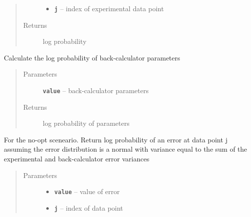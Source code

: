 \documentclass[letterpaper,10pt,english]{sphinxmanual}
\begin{document}
\begin{fulllineitems}
\begin{fulllineitems}
\begin{quote}
\begin{description}
\begin{itemize}
\item {} 
\textbf{\texttt{j}} -- index of experimental data point

\end{itemize}

\item[{Returns}] \leavevmode
log probability

\end{description}\end{quote}

\end{fulllineitems}


\begin{fulllineitems}
\label{modules:eisd.DataEISD._logp_params}
Calculate the log probability of back-calculator parameters
\begin{quote}\begin{description}
\item[{Parameters}] \leavevmode
\textbf{\texttt{value}} -- back-calculator parameters

\item[{Returns}] \leavevmode
log probability of parameters

\end{description}\end{quote}

\end{fulllineitems}


\begin{fulllineitems}
\label{modules:eisd.DataEISD._logp_total_err}
For the no-opt sceneario. Return log probability of an error
at data point j assuming the error distribution is a normal with
variance equal to the sum of the experimental and back-calculator
error variances
\begin{quote}\begin{description}
\item[{Parameters}] \leavevmode\begin{itemize}
\item {} 
\textbf{\texttt{value}} -- value of error

\item {} 
\textbf{\texttt{j}} -- index of data point


\end{itemize}
\end{description}
\end{quote}
\end{fulllineitems}
\end{fulllineitems}
\end{document}
